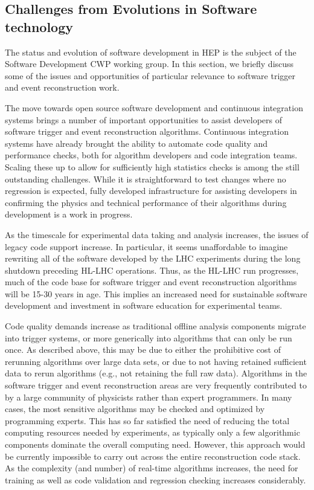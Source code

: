 \subsection{Challenges from Evolutions in Software technology}

The status and evolution of software development in HEP is the subject of the Software Development CWP working group. In this section, we briefly discuss some of the issues and opportunities of particular relevance to software trigger and event reconstruction work.

The move towards open source software development and continuous integration systems brings a number of important opportunities to assist developers of software trigger and event reconstruction algorithms. Continuous integration systems have already brought the ability to automate code quality and performance checks, both for algorithm developers and code integration teams. Scaling these up to allow for sufficiently high statistics checks is among the still outstanding challenges. While it is straightforward to test changes where no regression is expected, fully developed infrastructure for assisting developers in confirming the physics and technical performance of their algorithms during development is a work in progress.

As the timescale for experimental data taking and analysis increases, the issues of legacy code support increase. In particular, it seems unaffordable to imagine rewriting all of the software developed by the LHC experiments during the long shutdown preceding HL-LHC operations. Thus, as the HL-LHC run progresses, much of the code base for software trigger and event reconstruction algorithms will be 15-30 years in age. This implies an increased need for sustainable software development and investment in software education for experimental teams.

Code quality demands increase as traditional offline analysis components migrate into trigger systems, or more generically into algorithms that can only be run once. As described above, this may be due to either the prohibitive cost of rerunning algorithms over large data sets, or due to not having retained sufficient data to rerun algorithms (e.g., not retaining the full raw data). Algorithms in the software trigger and event reconstruction areas are very frequently contributed to by a large community of physicists rather than expert programmers. In many cases, the most sensitive algorithms may be checked and optimized by programming experts. This has so far satisfied the need of reducing the total computing resources needed by experiments, as typically only a few algorithmic components dominate the overall computing need. However, this approach would be currently impossible to carry out across the entire reconstruction code stack. As the complexity (and number) of real-time algorithms increases, the need for training as well as code validation and regression checking increases considerably. 

